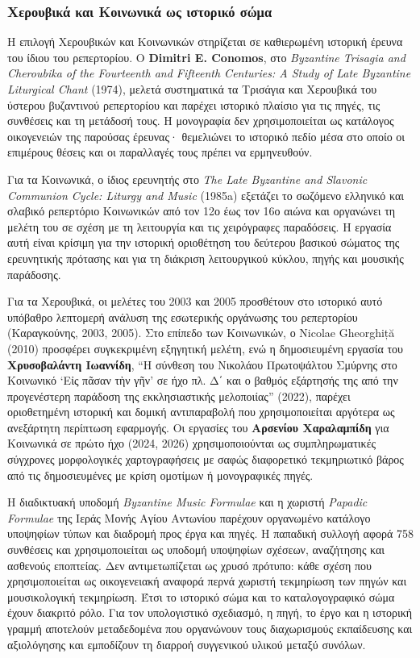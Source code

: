 \documentclass[11pt,a4paper]{article}
\begin{document}
\subsubsection{Χερουβικά και Κοινωνικά ως ιστορικό σώμα}

Η επιλογή Χερουβικών και Κοινωνικών στηρίζεται σε καθιερωμένη ιστορική έρευνα του ίδιου του ρεπερτορίου. Ο \textbf{Dimitri E. Conomos}, στο \emph{Byzantine Trisagia and Cheroubika of the Fourteenth and Fifteenth Centuries: A Study of Late Byzantine Liturgical Chant} (1974), μελετά συστηματικά τα Τρισάγια και Χερουβικά του ύστερου βυζαντινού ρεπερτορίου και παρέχει ιστορικό πλαίσιο για τις πηγές, τις συνθέσεις και τη μετάδοσή τους. Η μονογραφία δεν χρησιμοποιείται ως κατάλογος οικογενειών της παρούσας έρευνας· θεμελιώνει το ιστορικό πεδίο μέσα στο οποίο οι επιμέρους θέσεις και οι παραλλαγές τους πρέπει να ερμηνευθούν.

Για τα Κοινωνικά, ο ίδιος ερευνητής στο \emph{The Late Byzantine and Slavonic Communion Cycle: Liturgy and Music} (1985a) εξετάζει το σωζόμενο ελληνικό και σλαβικό ρεπερτόριο Κοινωνικών από τον 12ο έως τον 16ο αιώνα και οργανώνει τη μελέτη του σε σχέση με τη λειτουργία και τις χειρόγραφες παραδόσεις. Η εργασία αυτή είναι κρίσιμη για την ιστορική οριοθέτηση του δεύτερου βασικού σώματος της ερευνητικής πρότασης και για τη διάκριση λειτουργικού κύκλου, πηγής και μουσικής παράδοσης.

Για τα Χερουβικά, οι μελέτες του 2003 και 2005 προσθέτουν στο ιστορικό αυτό υπόβαθρο λεπτομερή ανάλυση της εσωτερικής οργάνωσης του ρεπερτορίου (Καραγκούνης, 2003, 2005). Στο επίπεδο των Κοινωνικών, ο Nicolae Gheorghiță (2010) προσφέρει συγκεκριμένη εξηγητική μελέτη, ενώ η δημοσιευμένη εργασία του \textbf{Χρυσοβαλάντη Ιωαννίδη}, ``Η σύνθεση του Νικολάου Πρωτοψάλτου Σμύρνης στο Κοινωνικό `Εἰς πᾶσαν τὴν γῆν' σε ήχο πλ. Δ΄ και ο βαθμός εξάρτησής της από την προγενέστερη παράδοση της εκκλησιαστικής μελοποιίας'' (2022), παρέχει οριοθετημένη ιστορική και δομική αντιπαραβολή που χρησιμοποιείται αργότερα ως ανεξάρτητη περίπτωση εφαρμογής. Οι εργασίες του \textbf{Αρσενίου Χαραλαμπίδη} για Κοινωνικά σε πρώτο ήχο (2024, 2026) χρησιμοποιούνται ως συμπληρωματικές σύγχρονες μορφολογικές χαρτογραφήσεις με σαφώς διαφορετικό τεκμηριωτικό βάρος από τις δημοσιευμένες με κρίση ομοτίμων ή μονογραφικές πηγές.

Η διαδικτυακή υποδομή \emph{Byzantine Music Formulae} και η χωριστή \emph{Papadic Formulae} της Ιεράς Μονής Αγίου Αντωνίου παρέχουν οργανωμένο κατάλογο υποψηφίων τύπων και διαδρομή προς έργα και πηγές. Η παπαδική συλλογή αφορά 758 συνθέσεις και χρησιμοποιείται ως υποδομή υποψηφίων σχέσεων, αναζήτησης και ασθενούς εποπτείας. Δεν αντιμετωπίζεται ως χρυσό πρότυπο: κάθε σχέση που χρησιμοποιείται ως οικογενειακή αναφορά περνά χωριστή τεκμηρίωση των πηγών και μουσικολογική τεκμηρίωση. Έτσι το ιστορικό σώμα και το καταλογογραφικό σώμα έχουν διακριτό ρόλο. Για τον υπολογιστικό σχεδιασμό, η πηγή, το έργο και η ιστορική γραμμή αποτελούν μεταδεδομένα που οργανώνουν τους διαχωρισμούς εκπαίδευσης και αξιολόγησης και εμποδίζουν τη διαρροή συγγενικού υλικού μεταξύ συνόλων.
\end{document}
